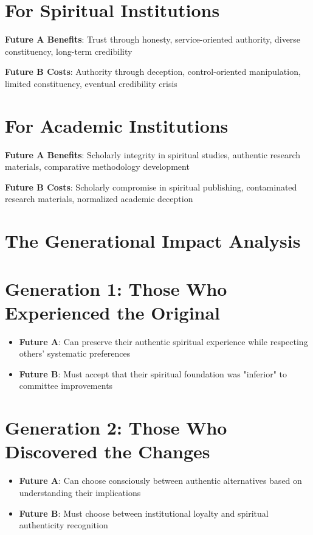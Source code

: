 \documentclass[11pt,twoside]{book}
\begin{document}
\section*{For Spiritual Institutions}
\label{sec:org73c8a71}
\textbf{\textbf{Future A Benefits}}: Trust through honesty, service-oriented authority, diverse constituency, long-term credibility

\textbf{\textbf{Future B Costs}}: Authority through deception, control-oriented manipulation, limited constituency, eventual credibility crisis
\section*{For Academic Institutions}
\label{sec:org14f6799}
\textbf{\textbf{Future A Benefits}}: Scholarly integrity in spiritual studies, authentic research materials, comparative methodology development

\textbf{\textbf{Future B Costs}}: Scholarly compromise in spiritual publishing, contaminated research materials, normalized academic deception
\section*{The Generational Impact Analysis}
\label{sec:orga80aa1a}

\section*{Generation 1: Those Who Experienced the Original}
\label{sec:org9911c9e}
\begin{itemize}
\item \textbf{\textbf{Future A}}: Can preserve their authentic spiritual experience while respecting others' systematic preferences
\item \textbf{\textbf{Future B}}: Must accept that their spiritual foundation was "inferior" to committee improvements
\end{itemize}
\section*{Generation 2: Those Who Discovered the Changes}
\label{sec:org623a489}
\begin{itemize}
\item \textbf{\textbf{Future A}}: Can choose consciously between authentic alternatives based on understanding their implications
\item \textbf{\textbf{Future B}}: Must choose between institutional loyalty and spiritual authenticity recognition
\end{itemize}
\end{document}
